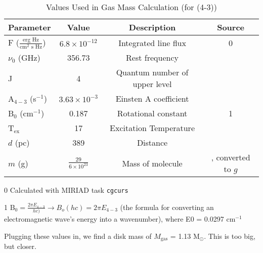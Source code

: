 \begin{table}
  \centering
  \begin{threeparttable}
    \caption{Values Used in Gas Mass Calculation (for \hco(4-3))}
    \label{tab:mass_calc_vals}
    \renewcommand{\arraystretch}{1.2}
    \begin{tabular}{l | c | c | c }
      \toprule \toprule
      Parameter            & Value   & Description         & Source  \\
      \midrule %
      F ($\frac{\text{erg Hz}}{\text{cm$^2$ s Hz}}$) & $6.8 \times 10^{-12}$ & Integrated line flux     &  0 \\
      $\nu_0$ (GHz)         & 356.73 & Rest frequency & \citet{Schoier2005} \\
      J                     & 4      & Quantum number of upper level & \\
      A$_{4-3}$ (s$^{-1}$)  & $3.63 \times 10^{-3}$  & Einsten A coefficient    & \citet{Schoier2005}  \\
      B$_0$ (cm$^{-1}$)     & 0.187  & Rotational constant      & 1 \\
      T$_\text{ex}$         & 17     & Excitation Temperature   & \citet{Factor2017}  \\
      $d$ (pc)              & 389    & Distance & \cite{GaiaCollaboration2018}  \\
      $m$ (g)               & $\frac{29}{6 \times 10^{23}}$ & Mass of molecule & \citet{Schoier2005}, converted to $g$ \\
      \bottomrule
    \end{tabular}
    \begin{tablenotes}\footnotesize
      \item[0] Calculated with MIRIAD task \texttt{cgcurs}
      \item[1] B$_0 = \frac{2 \pi E_{4-3}}{h c)} \rightarrow B_o (hc) = 2\pi E_{4-3}$ (the formula for converting an electromagnetic wave's energy into a wavenumber), where E0 = 0.0297 cm$^{-1}$
    \end{tablenotes}
  \end{threeparttable}
\end{table}

Plugging these values in, we find a disk mass of $M_\text{gas}$ = 1.13 M$_\odot$. This is too big, but closer.



